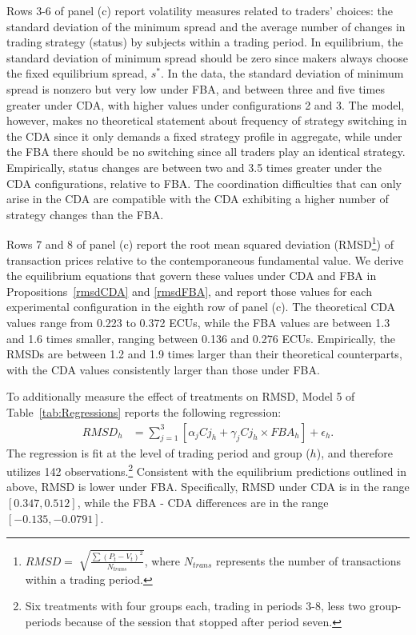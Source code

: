 \documentclass[12pt]{article}
\begin{document}
Rows 3-6 of panel (c) report volatility measures related to traders' choices: the standard deviation of the minimum spread and the average number of changes in trading strategy (status) by subjects within a trading period. In equilibrium, the standard deviation of minimum spread should be zero since makers always choose the fixed equilibrium spread, $s^*$. In the data, the standard deviation of minimum spread is nonzero but very low under FBA, and between three and five times greater under CDA, with higher values under configurations 2 and 3.
The model, however, makes no theoretical statement about frequency of strategy switching in the CDA since it only demands a fixed strategy profile in aggregate, while under the FBA there should be no switching since all traders play an identical strategy. Empirically, status changes are between two and 3.5 times greater under the CDA configurations, relative to FBA. The coordination difficulties that can only arise in the CDA are compatible with the CDA exhibiting a higher number of strategy changes than the FBA.

Rows 7 and 8 of panel (c) report the root mean squared deviation (RMSD\footnote{\label{footnoteRMSD} $RMSD = \sqrt[]{\frac{\sum(P_t-V_t)^2}{N_{trans}}}$, where $N_{trans}$ represents the number of transactions within a trading period.}) of transaction prices relative to the contemporaneous fundamental value. We derive the equilibrium equations that govern these values under CDA and FBA in Propositions~\ref{rmsdCDA} and \ref{rmsdFBA}, and report those values for each experimental configuration in the eighth row of panel (c). The theoretical CDA values range from 0.223 to 0.372 ECUs, while the FBA values are between 1.3 and 1.6 times smaller, ranging between 0.136 and 0.276 ECUs. Empirically, the RMSDs are between 1.2 and 1.9 times larger than their theoretical counterparts, with the CDA values consistently larger than those under FBA.

To additionally measure the effect of treatments on RMSD, Model 5 of Table~\ref{tab:Regressions} reports the following regression:
\begin{align} \label{eq:RegSpecRMSD}
RMSD_h & = \sum_{j=1}^{3} \left[ \alpha_j Cj_{h} + \gamma_j  Cj_{h} \times FBA_{h}   \right]  + \epsilon_{h}.
\end{align}
The regression is fit at the level of trading period and group ($h$), and therefore utilizes 142 observations.\footnote{Six treatments with four groups each, trading in periods 3-8, less two group-periods because of the session that stopped after period seven.} 
Consistent with the equilibrium predictions outlined in above, RMSD is lower under FBA. Specifically, RMSD under CDA is in the range $[0.347,0.512]$, while the FBA - CDA differences are in the range $[-0.135, -0.0791]$. 
\end{document}
